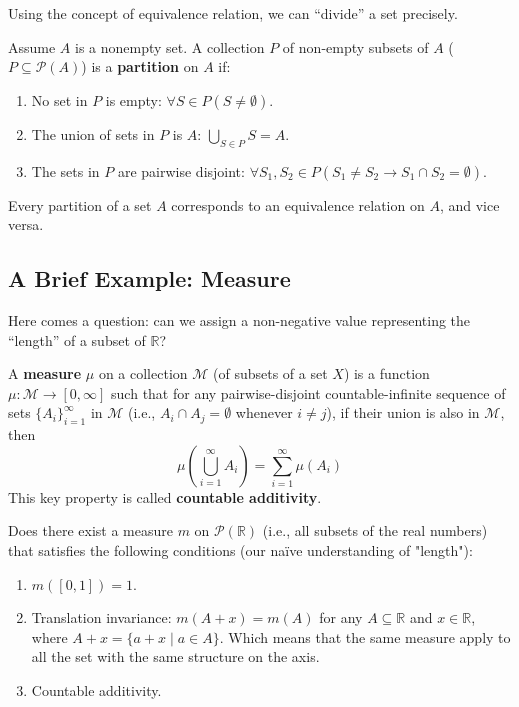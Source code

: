 \documentclass[oneside]{book}
\begin{document}
Using the concept of equivalence relation, we can “divide” a set precisely.
\begin{definition}[Partition]
Assume $A$ is a nonempty set. A collection $P$ of non-empty subsets of $A$ ($P \subseteq \mathcal{P}(A)$) is a \textbf{partition} on $A$ if:
\begin{enumerate}
    \item No set in $P$ is empty: $\forall S \in P (S \ne \emptyset)$.
    \item The union of sets in $P$ is $A$: $\bigcup_{S \in P} S = A$.
    \item The sets in $P$ are pairwise disjoint: $\forall S_1, S_2 \in P (S_1 \ne S_2 \to S_1 \cap S_2 = \emptyset)$.
\end{enumerate}
\end{definition}

\begin{theorem}
Every partition of a set $A$ corresponds to an equivalence relation on $A$, and vice versa.
\end{theorem}

\subsection{A Brief Example: Measure}
Here comes a question: can we assign a non-negative value representing the “length” of a subset of $\mathbb{R}$?

\begin{definition}[Measure]
A \textbf{measure} $\mu$ on a collection $\mathcal{M}$ (of subsets of a set $X$) is a function $\mu: \mathcal{M} \to [0, \infty]$ such that for any pairwise-disjoint countable-infinite sequence of sets $\{A_i\}_{i=1}^\infty$ in $\mathcal{M}$ (i.e., $A_i \cap A_j = \emptyset$ whenever $i \ne j$), if their union is also in $\mathcal{M}$, then
$$ \mu\left(\bigcup_{i=1}^\infty A_i\right) = \sum_{i=1}^\infty \mu(A_i) $$
This key property is called \textbf{countable additivity}.
\end{definition}

Does there exist a measure $m$ on $\mathcal{P}(\mathbb{R})$ (i.e., all subsets of the real numbers) that satisfies the following conditions (our naïve understanding of "length"):
\begin{enumerate}
    \item $m([0,1]) = 1$.
    \item Translation invariance: $m(A+x) = m(A)$ for any $A \subseteq \mathbb{R}$ and $x \in \mathbb{R}$, where $A+x = \{a+x \mid a \in A\}$. Which means that the same measure apply to all the set with the same structure on the axis.
    \item Countable additivity.
\end{enumerate}
\end{document}
